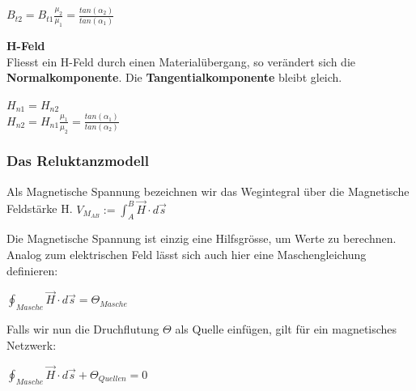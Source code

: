  $\displaystyle B_{t2} = B_{t1} \frac{\mu_2}{\mu_1}  = \frac{tan(\alpha_2)}{tan(\alpha_1)}$
\formulaEnd

\textbf{H-Feld} \\
Fliesst ein H-Feld durch einen Materialübergang, so verändert sich die \textbf{Normalkomponente}. Die \textbf{Tangentialkomponente} bleibt gleich.

\begin{center}
\end{center}

\formulaBegin
$ \displaystyle H_{n1} = H_{n2}$
\\ \fspace
$\displaystyle H_{n2} = H_{n1} \frac{\mu_1}{\mu_2} = \frac{tan(\alpha_1)}{tan(\alpha_2)} $
\formulaEnd




\subsubsection{Das Reluktanzmodell}

	\beginip
	Als Magnetische Spannung bezeichnen wir das Wegintegral über die Magnetische Feldstärke H.
	\formulaBegin
	$\displaystyle V_{M_{AB}} := \int_A^B \vec{H} \cdot d\vec{s}$
	\formulaEnd

	Die Magnetische Spannung ist einzig eine Hilfsgrösse, um Werte zu berechnen. \\
	Analog zum elektrischen Feld lässt sich auch hier eine Maschengleichung definieren: \\
	\begin{center}
		$\displaystyle \oint_{Masche} \vec{H} \cdot d\vec{s} = \Theta_{Masche}$
	\end{center}
		Falls wir nun die Druchflutung $\Theta$ als Quelle einfügen, gilt für ein magnetisches Netzwerk:
		\begin{center}
			$\displaystyle \oint_{Masche} \vec{H} \cdot d\vec{s} + \Theta_{Quellen} = 0$
		\end{center}
	\iend

